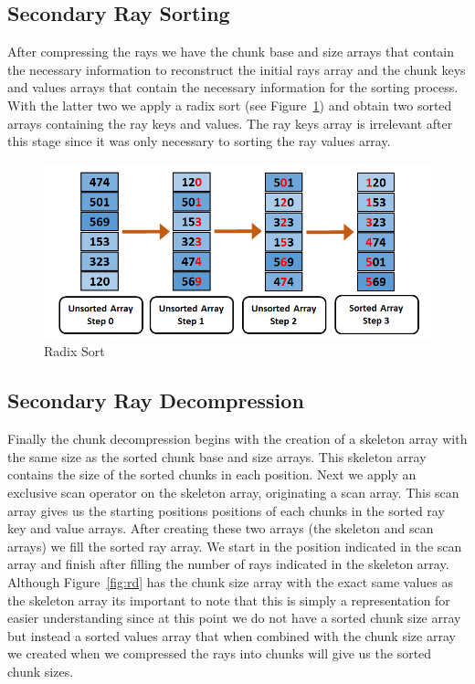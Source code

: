 \subsection{Secondary Ray Sorting}

After compressing the rays we have the chunk base and size arrays that contain the necessary information to reconstruct the initial rays array and the chunk keys and values arrays that contain the necessary information for the sorting process. With the latter two we apply a radix sort \cite{Merrill11} (see Figure~\ref{fig:rs}) and obtain two sorted arrays containing the ray keys and values. The ray keys array is irrelevant after this stage since it was only necessary to sorting the ray values array.

\begin{figure}[!htb]
    \centering
    \includegraphics[scale=0.75]{Images/Radix_Sort}
    \caption{\label{fig:rs}Radix Sort}
\end{figure}

\subsection{Secondary Ray Decompression}

Finally the chunk decompression begins with the creation of a skeleton array with the same size as the sorted chunk base and size arrays. This skeleton array contains the size of the sorted chunks in each position. Next we apply an exclusive scan operator on the skeleton array, originating a scan array. This scan array gives us the starting positions positions of each chunks in the sorted ray key and value arrays. After creating these two arrays (the skeleton and scan arrays) we fill the sorted ray array. We start in the position indicated in the scan array and finish after filling the number of rays indicated in the skeleton array. Although Figure~\ref{fig:rd} has the chunk size array with the exact same values as the skeleton array its important to note that this is simply a representation for easier understanding since at this point we do not have a sorted chunk size array but instead a sorted values array that when combined with the chunk size array we created when we compressed the rays into chunks will give us the sorted chunk sizes.

